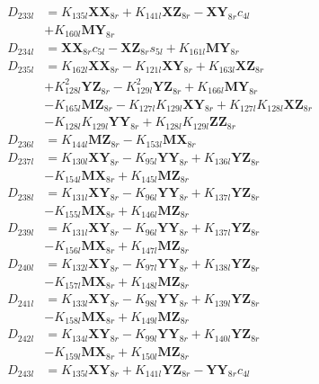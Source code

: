 \begin{align}
D_{233l} &= K_{135l}\mathbf{XX}_{8r} + K_{141l}\mathbf{XZ}_{8r} - \mathbf{XY}_{8r}c_{4l}  \nonumber \\
&+ K_{160l}\mathbf{MY}_{8r} \nonumber \\
D_{234l} &= \mathbf{XX}_{8r}c_{5l} - \mathbf{XZ}_{8r}s_{5l} + K_{161l}\mathbf{MY}_{8r} \nonumber \\
D_{235l} &= K_{162l}\mathbf{XX}_{8r} - K_{121l}\mathbf{XY}_{8r} + K_{163l}\mathbf{XZ}_{8r}  \nonumber \\
&+ K_{128l}^2\mathbf{YZ}_{8r} - K_{129l}^2\mathbf{YZ}_{8r} + K_{166l}\mathbf{MY}_{8r}  \nonumber \\
&- K_{165l}\mathbf{MZ}_{8r} - K_{127l}K_{129l}\mathbf{XY}_{8r} + K_{127l}K_{128l}\mathbf{XZ}_{8r}  \nonumber \\
&- K_{128l}K_{129l}\mathbf{YY}_{8r} + K_{128l}K_{129l}\mathbf{ZZ}_{8r} \nonumber \\
D_{236l} &= K_{144l}\mathbf{MZ}_{8r} - K_{153l}\mathbf{MX}_{8r} \nonumber \\
D_{237l} &= K_{130l}\mathbf{XY}_{8r} - K_{95l}\mathbf{YY}_{8r} + K_{136l}\mathbf{YZ}_{8r}  \nonumber \\
&- K_{154l}\mathbf{MX}_{8r} + K_{145l}\mathbf{MZ}_{8r} \nonumber \\
D_{238l} &= K_{131l}\mathbf{XY}_{8r} - K_{96l}\mathbf{YY}_{8r} + K_{137l}\mathbf{YZ}_{8r}  \nonumber \\
&- K_{155l}\mathbf{MX}_{8r} + K_{146l}\mathbf{MZ}_{8r} \nonumber \\
D_{239l} &= K_{131l}\mathbf{XY}_{8r} - K_{96l}\mathbf{YY}_{8r} + K_{137l}\mathbf{YZ}_{8r}  \nonumber \\
&- K_{156l}\mathbf{MX}_{8r} + K_{147l}\mathbf{MZ}_{8r} \nonumber \\
D_{240l} &= K_{132l}\mathbf{XY}_{8r} - K_{97l}\mathbf{YY}_{8r} + K_{138l}\mathbf{YZ}_{8r}  \nonumber \\
&- K_{157l}\mathbf{MX}_{8r} + K_{148l}\mathbf{MZ}_{8r} \nonumber \\
D_{241l} &= K_{133l}\mathbf{XY}_{8r} - K_{98l}\mathbf{YY}_{8r} + K_{139l}\mathbf{YZ}_{8r}  \nonumber \\
&- K_{158l}\mathbf{MX}_{8r} + K_{149l}\mathbf{MZ}_{8r} \nonumber \\
D_{242l} &= K_{134l}\mathbf{XY}_{8r} - K_{99l}\mathbf{YY}_{8r} + K_{140l}\mathbf{YZ}_{8r}  \nonumber \\
&- K_{159l}\mathbf{MX}_{8r} + K_{150l}\mathbf{MZ}_{8r} \nonumber \\
D_{243l} &= K_{135l}\mathbf{XY}_{8r} + K_{141l}\mathbf{YZ}_{8r} - \mathbf{YY}_{8r}c_{4l}  \nonumber \\

\end{align}
